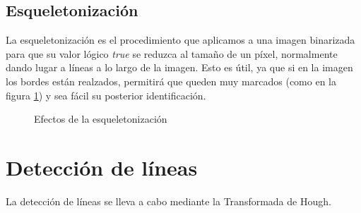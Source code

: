 \subsection{Esqueletonización}
\label{Esqueletonizacion}
La esqueletonización es el procedimiento que aplicamos a una imagen binarizada para que su valor lógico \textit{true} se reduzca al tamaño de un píxel, normalmente dando lugar a líneas a lo largo de la imagen. Esto es útil, ya que si en la imagen los bordes están realzados, permitirá que queden muy marcados (como en la figura \ref{fig:Skeletonize}) y sea fácil su posterior identificación.

\begin{figure}[H]
\centering
{}
\caption{Efectos de la esqueletonización}
\label{fig:Skeletonize}
\end{figure}


\section{Detección de líneas}
\label{Hough}
La detección de líneas se lleva a cabo mediante la Transformada de Hough.


